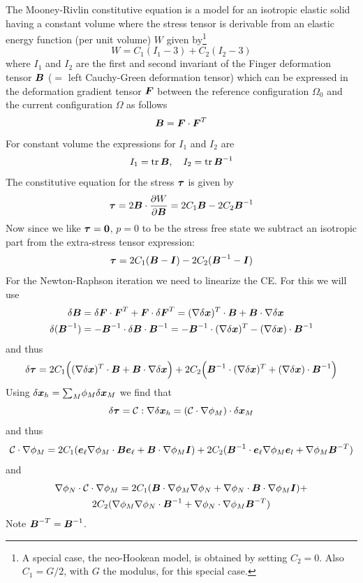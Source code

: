 The Mooney-Rivlin constitutive equation is a model for an isotropic
elastic solid having a constant volume where the stress tensor is derivable
from an elastic energy function (per unit volume) $W$ given by\footnote{A special case, the neo-Hookean model, is obtained by setting $C_2=0$. Also $C_1=G/2$, with $G$ the modulus, for this special case.}
\[
    W=C_1(I_1-3)+C_2(I_2-3)
\]
where $I_1$ and $I_2$ are the first and second invariant of 
the Finger deformation tensor $\boldsymbol{B}$ 
($=$ left Cauchy-Green deformation tensor) which can be expressed in the
deformation gradient tensor $\boldsymbol{F}$ between the reference configuration
$\Omega_0$ and the current configuration $\Omega$ as follows 
\[
    \boldsymbol{B}=\boldsymbol{F}\cdot\boldsymbol{F}^T
\]
For constant volume the expressions for $I_1$ and $I_2$ are 
\[
      I_1=\operatorname{tr}\boldsymbol{B},\quad I_2=\operatorname{tr}\boldsymbol{B}^{-1}
\]
The constitutive equation for the stress $\boldsymbol{\tau}$ is given by
\[
   \boldsymbol{\tau} = 2\boldsymbol{B}\cdot\dfrac{\partial W}{\partial \boldsymbol{B}}=
              2C_1\boldsymbol{B} - 2C_2\boldsymbol{B}^{-1}
\]
Now since we like $\boldsymbol{\tau}=\boldsymbol{0}$, $p=0$ to be the stress free state we
subtract an isotropic part from the extra-stress tensor expression:
\[
   \boldsymbol{\tau} = 2C_1(\boldsymbol{B} -\boldsymbol{I}) - 2C_2(\boldsymbol{B}^{-1}-\boldsymbol{I})
\]
For the Newton-Raphson iteration we need to linearize the CE. For this we will
use
\begin{align*}
   \delta\boldsymbol{B}&=\delta\boldsymbol{F}\cdot\boldsymbol{F}^T+\boldsymbol{F}\cdot\delta\boldsymbol{F}^T=
        (\nabla\delta\boldsymbol{x})^T\cdot\boldsymbol{B}+\boldsymbol{B}\cdot\nabla\delta\boldsymbol{x}\\
   \delta(\boldsymbol{B}^{-1})&=-\boldsymbol{B}^{-1}\cdot\delta\boldsymbol{B}\cdot\boldsymbol{B}^{-1}=
  -\boldsymbol{B}^{-1}\cdot(\nabla\delta\boldsymbol{x})^T-(\nabla\delta\boldsymbol{x})\cdot\boldsymbol{B}^{-1}
\end{align*}
and thus
\[
   \delta\boldsymbol{\tau}=
    2C_1\Big((\nabla\delta\boldsymbol{x})^T\cdot\boldsymbol{B}+
              \boldsymbol{B}\cdot\nabla\delta\boldsymbol{x}\Big)
   +2C_2\Big(\boldsymbol{B}^{-1}\cdot(\nabla\delta\boldsymbol{x})^T+
              (\nabla\delta\boldsymbol{x})\cdot\boldsymbol{B}^{-1}\Big)
\]
Using $\delta\boldsymbol{x}_h={\textstyle\sum}_M \phi_M\delta\boldsymbol{x}_M$ we find that
\[
   \delta\boldsymbol{\tau}=\mathcal{C}:\nabla\delta\boldsymbol{x}_h=
                  (\mathcal{C}\cdot\nabla\phi_M)\cdot\delta\boldsymbol{x}_M
\]
and thus
\[
     \mathcal{C}\cdot\nabla\phi_M = 
           2C_1(\boldsymbol{e}_\ell\nabla\phi_M\cdot\boldsymbol{B}\boldsymbol{e}_\ell
                +\boldsymbol{B}\cdot\nabla\phi_M\boldsymbol{I})
          +2C_2(\boldsymbol{B}^{-1}\cdot\boldsymbol{e}_\ell\nabla\phi_M\boldsymbol{e}_l
               +\nabla\phi_M\boldsymbol{B}^{-T})
\]
and
\begin{multline*}
     \nabla\phi_N\cdot\mathcal{C}\cdot\nabla\phi_M = 
           2C_1(\boldsymbol{B}\cdot\nabla\phi_M\nabla\phi_N+
                \nabla\phi_N\cdot\boldsymbol{B}\cdot\nabla\phi_M\boldsymbol{I})+\\
          2C_2(\nabla\phi_M\nabla\phi_N\cdot\boldsymbol{B}^{-1}
               +\nabla\phi_N\cdot\nabla\phi_M\boldsymbol{B}^{-T})
\end{multline*}
Note $\boldsymbol{B}^{-T}=\boldsymbol{B}^{-1}$.

